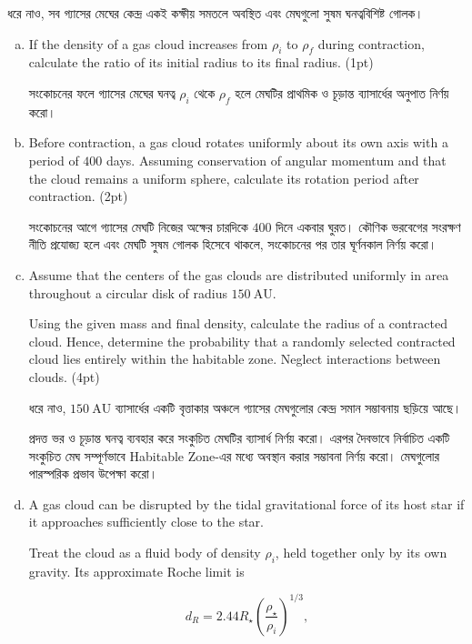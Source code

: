\documentclass[10pt,a5paper,twoside]{article}
\newcommand{\m}[1]{%
	\unskip\nobreak\hfill
	\mbox{\normalfont(#1pt)}%
}
\begin{document}
ধরে নাও, সব গ্যাসের মেঘের কেন্দ্র একই কক্ষীয় সমতলে অবস্থিত এবং মেঘগুলো সুষম ঘনত্ববিশিষ্ট গোলক।

\begin{enumerate}[a.]
	
	\item If the density of a gas cloud increases from $\rho_i$ to $\rho_f$ during contraction, calculate the ratio of its initial radius to its final radius. \m{1}
	
	সংকোচনের ফলে গ্যাসের মেঘের ঘনত্ব $\rho_i$ থেকে $\rho_f$ হলে মেঘটির প্রাথমিক ও চূড়ান্ত ব্যাসার্ধের অনুপাত নির্ণয় করো।
	
	\item Before contraction, a gas cloud rotates uniformly about its own axis with a period of $400$ days. Assuming conservation of angular momentum and that the cloud remains a uniform sphere, calculate its rotation period after contraction. \m{2}
	
	সংকোচনের আগে গ্যাসের মেঘটি নিজের অক্ষের চারদিকে $400$ দিনে একবার ঘুরত। কৌণিক ভরবেগের সংরক্ষণ নীতি প্রযোজ্য হলে এবং মেঘটি সুষম গোলক হিসেবে থাকলে, সংকোচনের পর তার ঘূর্ণনকাল নির্ণয় করো।
	
	\item Assume that the centers of the gas clouds are distributed uniformly in area throughout a circular disk of radius $150~\mathrm{AU}$.
	
	Using the given mass and final density, calculate the radius of a contracted cloud. Hence, determine the probability that a randomly selected contracted cloud lies entirely within the habitable zone. Neglect interactions between clouds. \m{4}
	
	ধরে নাও, $150~\mathrm{AU}$ ব্যাসার্ধের একটি বৃত্তাকার অঞ্চলে গ্যাসের মেঘগুলোর কেন্দ্র সমান সম্ভাবনায় ছড়িয়ে আছে।
	
	প্রদত্ত ভর ও চূড়ান্ত ঘনত্ব ব্যবহার করে সংকুচিত মেঘটির ব্যাসার্ধ নির্ণয় করো। এরপর দৈবভাবে নির্বাচিত একটি সংকুচিত মেঘ সম্পূর্ণভাবে Habitable Zone-এর মধ্যে অবস্থান করার সম্ভাবনা নির্ণয় করো। মেঘগুলোর পারস্পরিক প্রভাব উপেক্ষা করো।
	
	\item A gas cloud can be disrupted by the tidal gravitational force of its host star if it approaches sufficiently close to the star.
	
	Treat the cloud as a fluid body of density $\rho_i$, held together only by its own gravity. Its approximate Roche limit is
	
	\[
	d_R=2.44R_\star
	\left(\frac{\rho_\star}{\rho_i}\right)^{1/3},
	\]
	

\end{enumerate}
\end{document}
